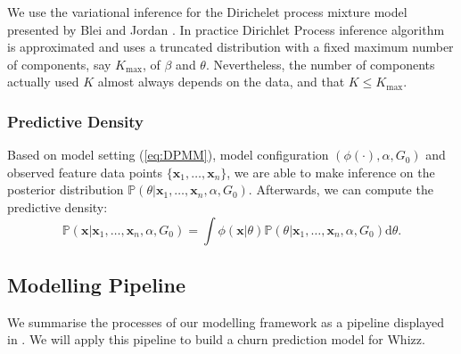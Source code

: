 We use the variational inference for the Dirichelet process mixture model presented by Blei and Jordan \cite{blei2006}. In practice Dirichlet Process inference algorithm is approximated and uses a truncated distribution with a fixed maximum number of components, say $K_{\max}$, of $\beta$ and $\theta$. Nevertheless, the number of components actually used $K$ almost always depends on the data, and that $K \leq K_{\max}$.

\subsubsection{Predictive Density}

Based on model setting (\ref{eq:DPMM}), model configuration $(\phi(\cdot), \alpha, G_0)$ and observed feature data points $\{ \mathbf{x}_1, \dots, \mathbf{x}_n \}$, we are able to make inference on the posterior distribution $\mathbb{P}(\theta | \mathbf{x}_1, \dots, \mathbf{x}_n, \alpha, G_0)$. Afterwards, we can compute the predictive density:
\begin{equation}
\mathbb{P} (\mathbf{x} | \mathbf{x}_1, \dots, \mathbf{x}_n, \alpha, G_0) = \int \phi(\mathbf{x} | \theta ) \mathbb{P}(\theta | \mathbf{x}_1, \dots, \mathbf{x}_n, \alpha, G_0) \text{d} \theta.
\end{equation}

\subsection{Modelling Pipeline}
\label{sec:modelPipeline}

We summarise the processes of our modelling framework as a pipeline displayed in . We will apply this pipeline to build a churn prediction model for Whizz.

